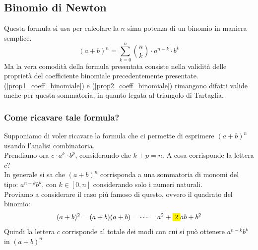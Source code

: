 \documentclass[12pt]{article}
\begin{document}
\subsection{Binomio di Newton}
Questa formula si usa per calcolare la $n$-sima potenza di un binomio in maniera semplice.
\begin{equation}
    (a+b)^n = \sum_{k=0}^{n} \binom{n}{k} \cdot a^{n-k} \cdot b^k \label{eq:binom_newton}
\end{equation}
Ma la vera comodità della formula presentata consiste nella validità delle proprietà del coefficiente binomiale precedentemente presentate.\\
(\ref{prop1_coeff_binomiale}) e (\ref{prop2_coeff_binomiale}) rimangono difatti valide anche per questa sommatoria, in quanto legata al triangolo di Tartaglia.\\
\subsubsection{Come ricavare tale formula?}
Supponiamo di voler ricavare la formula che ci permette di esprimere $(a+b)^{n}$ usando l'analisi combinatoria.\\
Prendiamo ora $c \cdot a^k \cdot b^p$, considerando che $k+p=n$. A cosa corrisponde la lettera $c$?\\
In generale si sa che $(a+b)^{n}$ corrisponda a una sommatoria di monomi del tipo: $a^{n-k}b^{k}$, con $k \in [0, n]$ considerando solo i numeri naturali.\\
Proviamo a considerare il caso più famoso di questo, ovvero il quadrato del binomio:
\[(a + b)^2 = (a + b)(a + b) = \dots = a^2 + \colorbox{yellow}{2}ab + b^2\]
Quindi la lettera $c$ corrisponde al totale dei modi con cui si può ottenere $a^{n-k}b^{k}$ in $(a + b)^{n}$
\end{document}

